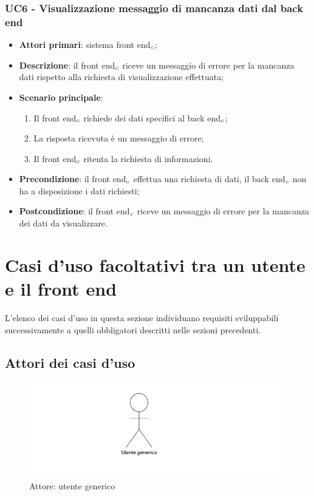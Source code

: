 \subsubsection{UC6 - Visualizzazione messaggio di mancanza dati dal back end}\label{VisualizzazioneMancanzaBackEnd}
\begin{itemize}
	\item \textbf{Attori primari}: sistema front end$_{\scaleto{G}{3pt}}$;
	\item \textbf{Descrizione}: il front end$_{\scaleto{G}{3pt}}$ riceve un messaggio di errore per la mancanza dati rispetto alla richiesta di visualizzazione effettuata;
	\item \textbf{Scenario principale}: 
	\begin{enumerate}
		\item Il front end$_{\scaleto{G}{3pt}}$ richiede dei dati specifici al back end$_{\scaleto{G}{3pt}}$;
		\item La risposta ricevuta è un messaggio di errore;
		\item Il front end$_{\scaleto{G}{3pt}}$ ritenta la richiesta di informazioni. 
	\end{enumerate}
	\item \textbf{Precondizione}: il front end$_{\scaleto{G}{3pt}}$ effettua una richiesta di dati, il back end$_{\scaleto{G}{3pt}}$ non ha a disposizione i dati richiesti;
	\item \textbf{Postcondizione}: il front end$_{\scaleto{G}{3pt}}$ riceve un messaggio di errore per la mancanza dei dati da visualizzare. 
\end{itemize}

\section{Casi d'uso facoltativi tra un utente e il front end}
L'elenco dei casi d'uso in questa sezione individuano requisiti sviluppabili successivamente a quelli obbligatori descritti nelle sezioni precedenti.
\subsection{Attori dei casi d'uso}
\begin{center}
	\begin{figure}[H]
		\includegraphics{../immagini/attori_casi/utente_generico.png}
		\caption{Attore: utente generico}
	\end{figure}
\end{center}
